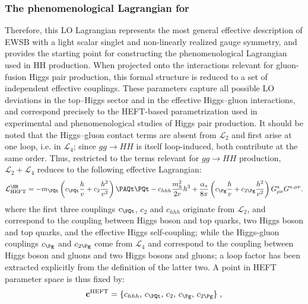 \subsubsection{The phenomenological Lagrangian for \texorpdfstring{\ggHH}{gg → HH}}
Therefore, this LO Lagrangian represents the most general effective description of EWSB with a light scalar singlet and non-linearly realized gauge symmetry, and provides the starting point for constructing the phenomenological Lagrangian used in HH production. When projected onto the interactions relevant for gluon-fusion Higgs pair production, this formal structure is reduced to a set of independent effective couplings. These parameters capture all possible LO deviations in the top–Higgs sector and in the effective Higgs–gluon interactions, and correspond precisely to the HEFT-based parametrization used in experimental and phenomenological studies of Higgs pair production. It should be noted that the Higgs–gluon contact terms are absent from $\mathcal{L}_2$ and first arise at one loop, i.e. in $\mathcal{L}_4$; since $gg\to HH$ is itself loop-induced, both contribute at the same order. Thus, restricted to the terms relevant for $gg\to HH$ production, $\mathcal{L}_2+\mathcal{L}_4$ reduces to the following effective Lagrangian:%
\begin{equation}
    \mathcal{L}_{\text{HEFT}}^{\HH}
    =-m_\PQt\left(c_\PQt\frac{h}{v}+c_{2}\frac{h^2}{v^2}\right)\PAQt\PQt-c_{hhh}\frac{m_h^2}{2v}h^3+\frac{\alpha_s}{8\pi}\left(c_{\Pg}\frac{h}{v}+c_{2\Pg}\frac{h^2}{v^2}\right)G^a_{\mu\nu}G^{a,\mu\nu}.
    \label{eq:heftL}
\end{equation}
%
where the first three couplings $c_\PQt$, $c_{2}$ and $c_{hhh}$ originate from $\mathcal{L}_2$, and correspond to the coupling between Higgs boson and top quarks, two Higgs boson and top quarks, and the effective Higgs self-coupling; while the Higgs-gluon couplings $c_{\Pg}$ and $c_{2\Pg}$ come from $\mathcal{L}_4$ and correspond to the coupling between Higgs boson and gluons and two Higgs bosons and gluons; a loop factor has been extracted explicitly from the definition of the latter two. A point in HEFT parameter space is thus fixed by:
%
\begin{equation}
    \mathbf{c}^{\text{HEFT}} = \{c_{hhh},\,c_\PQt,\,c_2,\,c_\Pg,\,c_{2\Pg}\}\;,
    \label{eq:HEFT_param}
\end{equation}
%
